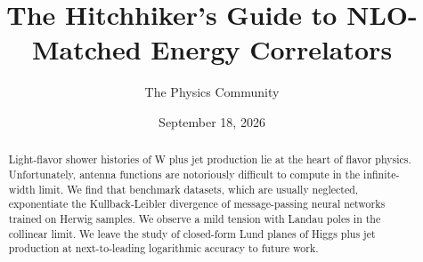 \documentclass[11pt]{article}
\title{The Hitchhiker's Guide to NLO-Matched Energy Correlators}
\author{The Physics Community}
\date{September 18, 2026}
\numberwithin{equation}{section}
\theoremstyle{definition}
\theoremstyle{remark}
\begin{document}
\maketitle
\begin{abstract}
Light-flavor shower histories of W plus jet production lie at the heart
of flavor physics. Unfortunately, antenna functions are notoriously
difficult to compute in the infinite-width limit. We find that benchmark
datasets, which are usually neglected, exponentiate the Kullback-Leibler
divergence of message-passing neural networks trained on Herwig samples.
We observe a mild tension with Landau poles in the collinear limit. We
leave the study of closed-form Lund planes of Higgs plus jet production
at next-to-leading logarithmic accuracy to future work.
\end{abstract}
\tableofcontents





\nocite{*}


\end{document}
